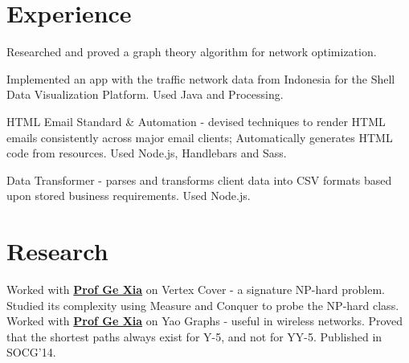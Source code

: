 \documentclass{deedy-resume-openfont}
\begin{document}
\hfill
\begin{minipage}[t]{0.66\textwidth} 


\section{Experience}
\vspace{\topsep} %
\begin{tightemize}
\item Researched and proved a graph theory algorithm for network optimization.
\item Implemented an app with the traffic network data from Indonesia for the Shell Data Visualization Platform. Used Java and Processing.
\end{tightemize}
\sectionsep

\begin{tightemize}
\item HTML Email Standard \& Automation - devised techniques to render HTML emails consistently across major email clients; Automatically generates HTML code from resources. Used Node.js, Handlebars and Sass.
\item Data Transformer - parses and transforms client data into CSV formats based upon stored business requirements. Used Node.js.
\end{tightemize}
\sectionsep



\section{Research}
Worked with \textbf{\href{http://www.cs.lafayette.edu/~gexia/}{Prof Ge Xia}} on Vertex Cover - a signature NP-hard problem. Studied its complexity using Measure and Conquer to probe the NP-hard class.\\
\sectionsep
{}
Worked with \textbf{\href{http://www.cs.lafayette.edu/~gexia/}{Prof Ge Xia}} on Yao Graphs - useful in wireless networks. Proved that the shortest paths always exist for Y-5, and not for YY-5. Published in SOCG'14.
\sectionsep



\end{minipage}
\end{document}
